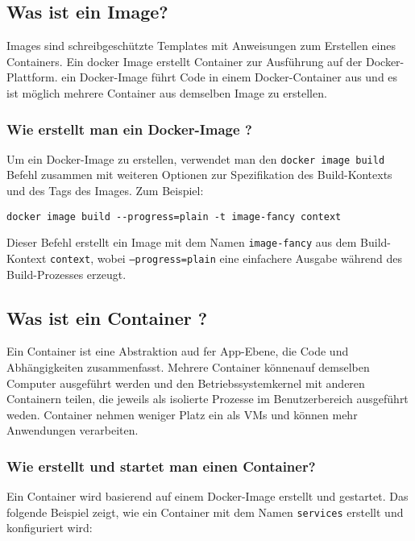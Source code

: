 \subsection{Was ist ein Image?}

Images sind schreibgeschützte Templates mit Anweisungen zum Erstellen eines Containers. Ein docker Image erstellt Container zur Ausführung auf der Docker-Plattform. ein Docker-Image führt Code in einem Docker-Container aus und es ist möglich mehrere Container aus demselben Image zu erstellen.

\subsubsection{Wie erstellt man ein Docker-Image ?}

Um ein Docker-Image zu erstellen, verwendet man den \texttt{docker image build} Befehl zusammen mit weiteren Optionen zur Spezifikation des Build-Kontexts und des Tags des Images. Zum Beispiel:

\begin{verbatim}
docker image build --progress=plain -t image-fancy context
\end{verbatim}

Dieser Befehl erstellt ein Image mit dem Namen \texttt{image-fancy} aus dem Build-Kontext \texttt{context}, wobei \texttt{--progress=plain} eine einfachere Ausgabe während des Build-Prozesses erzeugt.

\subsection{Was ist ein Container ? }

Ein Container ist eine Abstraktion aud fer App-Ebene, die Code und Abhängigkeiten zusammenfasst. Mehrere Container könnenauf demselben Computer ausgeführt werden und den Betriebssystemkernel mit anderen Containern teilen, die jeweils als isolierte Prozesse im Benutzerbereich ausgeführt weden. Container nehmen weniger Platz ein als VMs und können mehr Anwendungen verarbeiten.

\subsubsection{Wie erstellt und startet man einen Container?}

Ein Container wird basierend auf einem Docker-Image erstellt und gestartet. Das folgende Beispiel zeigt, wie ein Container mit dem Namen \texttt{services} erstellt und konfiguriert wird:

